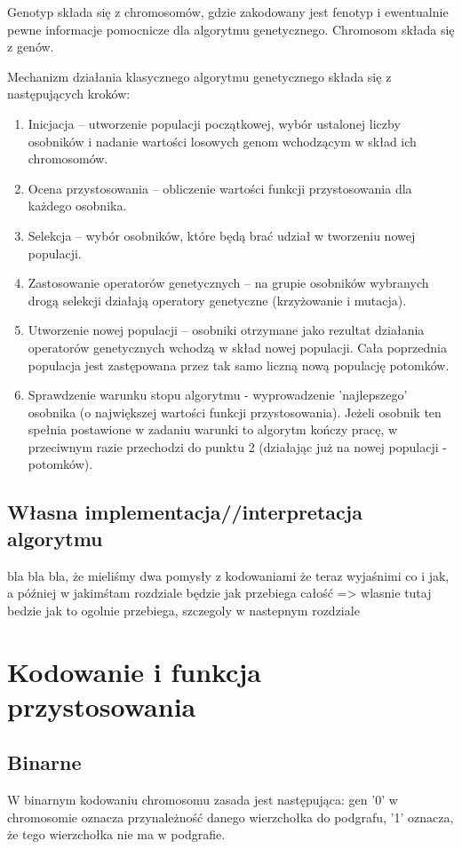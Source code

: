 \documentclass[11pt]{aghdpl}
\begin{document}
Genotyp składa się z chromosomów, gdzie zakodowany jest fenotyp i ewentualnie pewne informacje
pomocnicze dla algorytmu genetycznego. Chromosom składa się z genów.

Mechanizm działania klasycznego algorytmu genetycznego składa się z następujących kroków:
\begin{enumerate}
\item Inicjacja – utworzenie populacji początkowej, wybór ustalonej liczby osobników i nadanie wartości losowych 
genom wchodzącym w skład ich chromosomów.
\item Ocena przystosowania – obliczenie wartości funkcji przystosowania dla każdego osobnika.
\item Selekcja – wybór osobników, które będą brać udział w tworzeniu nowej populacji.
\item Zastosowanie operatorów genetycznych – na grupie osobników wybranych drogą selekcji działają
operatory genetyczne (krzyżowanie i mutacja).
\item Utworzenie nowej populacji – osobniki otrzymane jako rezultat działania operatorów
genetycznych wchodzą w skład nowej populacji. Cała poprzednia populacja jest zastępowana przez
tak samo liczną nową populację potomków.
\item Sprawdzenie warunku stopu algorytmu - wyprowadzenie 'najlepszego' osobnika (o największej wartości funkcji 
przystosowania). Jeżeli osobnik ten spełnia postawione w zadaniu warunki to algorytm kończy pracę, w przeciwnym 
razie przechodzi do punktu 2 (działając już na nowej populacji - potomków).

\end{enumerate}
\section{Własna implementacja//interpretacja algorytmu}
\label{sec:podejscie}
bla bla bla, że mieliśmy dwa pomysły z kodowaniami
że teraz wyjaśnimi co i jak, a później w jakimśtam rozdziale będzie jak przebiega całość => wlasnie tutaj bedzie 
jak to ogolnie przebiega, szczegoly w nastepnym rozdziale

\chapter{Kodowanie i funkcja przystosowania}
\label{cha:encoding}
\section{Binarne}
\label{sec:binary}
W binarnym kodowaniu chromosomu zasada jest następująca: gen '0' w chromosomie oznacza przynależność danego wierzchołka 
do podgrafu, '1' oznacza, że tego wierzchołka nie ma w podgrafie.
\end{document}
